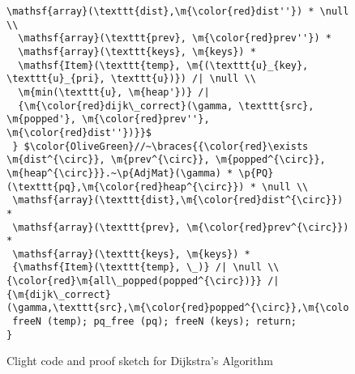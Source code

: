 \begin{figure}[t]
\begin{lstlisting}[mathescape=true,showlines=true]
  \mathsf{array}(\texttt{dist},\m{\color{red}dist''}) * \null \\
  \mathsf{array}(\texttt{prev}, \m{\color{red}prev''}) *
  \mathsf{array}(\texttt{keys}, \m{keys}) *
  \mathsf{Item}(\texttt{temp}, \m{(\texttt{u}_{key}, \texttt{u}_{pri}, \texttt{u})}) /| \null \\
  \m{min(\texttt{u}, \m{heap'})} /|
  {\m{\color{red}dijk\_correct}(\gamma, \texttt{src}, \m{popped'}, \m{\color{red}prev''}, \m{\color{red}dist''})}}$
 } $\color{OliveGreen}//~\braces{{\color{red}\exists \m{dist^{\circ}}, \m{prev^{\circ}}, \m{popped^{\circ}}, \m{heap^{\circ}}}.~\p{AdjMat}(\gamma) * \p{PQ}(\texttt{pq},\m{\color{red}heap^{\circ}}) * \null \\
 \mathsf{array}(\texttt{dist},\m{\color{red}dist^{\circ}}) * 
 \mathsf{array}(\texttt{prev}, \m{\color{red}prev^{\circ}}) *
 \mathsf{array}(\texttt{keys}, \m{keys}) * 
 {\mathsf{Item}(\texttt{temp}, \_)} /| \null \\
{\color{red}\m{all\_popped(popped^{\circ})}} /|
{\m{dijk\_correct}(\gamma,\texttt{src},\m{\color{red}popped^{\circ}},\m{\color{red}prev^{\circ}},\m{\color{red}dist^{\circ}})}}$
 freeN (temp); pq_free (pq); freeN (keys); return; 
}
\end{lstlisting}
\vspace{-1em}
\caption{Clight code and proof sketch for Dijkstra's Algorithm}
\vspace{-1em}
\label{fig:decorated}
\end{figure} 